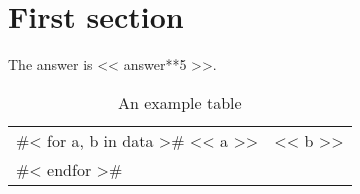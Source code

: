 \documentclass{article}
\begin{document}
\section{First section}

The answer is << answer**5 >>.

\begin{table}
\caption{An example table}
\begin{tabular}{l l}
#< for a, b in data >#
<< a >> & << b >> \\
#< endfor >#
\end{tabular}
\end{table}
\end{document}
